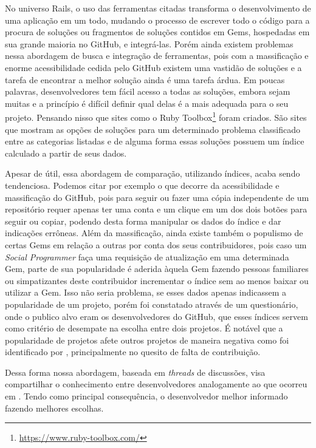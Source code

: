 No universo Rails, o uso das ferramentas citadas transforma o desenvolvimento de uma aplicação em um todo, mudando o processo de escrever todo o código para a procura de soluções ou fragmentos de soluções contidos em Gems, hospedadas em sua grande maioria no GitHub, e integrá-las. Porém ainda existem problemas nessa abordagem de busca e integração de ferramentas, pois com a massificação e enorme acessibilidade cedida pelo GitHub existem uma vastidão de soluções e a tarefa de encontrar a melhor solução ainda é uma tarefa árdua. Em poucas palavras, desenvolvedores tem fácil acesso a todas as soluções, embora sejam muitas e a princípio é difícil definir qual delas é a mais adequada para o seu projeto. Pensando nisso que sites como o Ruby Toolbox\footnote{\url{https://www.ruby-toolbox.com/}} foram criados. São sites que mostram as opções de soluções para um determinado problema classificado entre as categorias listadas e de alguma forma essas soluções possuem um índice calculado a partir de seus dados.

Apesar de útil, essa abordagem de comparação, utilizando índices, acaba sendo tendenciosa. Podemos citar por exemplo o que decorre da acessibilidade e massificação do GitHub, pois para seguir ou fazer uma cópia independente de um repositório requer apenas ter uma conta e um clique em um dos dois botões para seguir ou copiar, podendo desta forma manipular os dados do índice e dar indicações errôneas. Além da massificação, ainda existe também o populismo de certas Gems em relação a outras por conta dos seus contribuidores, pois caso um \textit{Social Programmer}\cite{Singer:2013:MAS:2441776.2441791} faça uma requisição de atualização em uma determinada Gem, parte de sua popularidade é aderida àquela Gem fazendo pessoas familiares ou simpatizantes deste contribuidor incrementar o índice sem ao menos baixar ou utilizar a Gem. Isso não seria problema, se esses dados apenas indicassem a popularidade de um projeto, porém foi constatado através de um questionário, onde o publico alvo eram os desenvolvedores do GitHub, que esses índices servem como critério de desempate na escolha entre dois projetos. É notável que a popularidade de projetos afete outros projetos de maneira negativa como foi identificado por \cite{michlmayr:quality_problems}, principalmente no quesito de falta de contribuição. 

Dessa forma nossa abordagem, baseada em \textit{threads} de discussões, visa compartilhar o conhecimento entre desenvolvedores analogamente ao que ocorreu em \cite{1997PhDT.......258H}. Tendo como principal consequência, o desenvolvedor melhor informado fazendo melhores escolhas.

